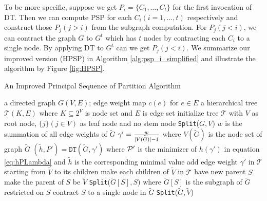 To be more specific, suppose we get $P_i = \{C_1, \dots, C_t\}$ for the first invocation of DT. Then we can compute PSP for each $C_i(i=1,\dots, t)$ respectively and construct those $P_j(j>i)$ from the subgraph computation. For $P_j(j<i)$, we can contract the graph $G$  to $G^t$ which has $t$ nodes by contracting each $C_i$ to a single node. By applying DT to $G^t$ can we get $P_j(j<i)$. We summarize our improved version (HPSP) in Algorithm \ref{alg:psp_i_simplified} and illustrate the algorithm by Figure \ref{fig:HPSP}.

\begin{algorithm}
	\caption{An Improved Principal Sequence of Partition Algorithm}\label{alg:psp_i_simplified}
	\begin{algorithmic}[1]
		\REQUIRE a directed graph $G(V, E)$; edge weight map $c(e)$ for $e\in E$
		\ENSURE a hierarchical tree $\mathcal{T}(K, E)$ where $K \subseteq 2^{V}$ is node set and $E$ is edge set
		\STATE initialize tree $\mathcal{T}$ with $V$ as root node, $\{j\}(j \in V)$ as leaf node and no stem node
		\STATE \texttt{Split}($G, V$)
		\STATE $w$ is the summation of all edge weights of $\widetilde{G}$ 
		\STATE $\gamma' = \frac{w}{\abs{V(\widetilde{G})}-1}$ where $V(\widetilde{G})$ is the node set of graph $\widetilde{G}$ \label{alg:gamma_apostrophe}
		\STATE $(\tilde{h}, P') = \texttt{DT}(\widetilde{G}, \gamma')$ where $\P'$ is the minimizer of $h(\gamma')$ in equation \eqref{eq:hPLambda} and $\tilde{h}$ is the corresponding minimal value  \label{line:DT}
		\STATE add edge weight $\gamma'$ in $\mathcal{T}$ starting from $\widetilde{V}$ to its children
		\ELSE
		\STATE make each children of $\widetilde{V}$ in $\mathcal{T}$ have new parent $S$		
		\STATE make the parent of $S$ be $\widetilde{V}$
		\STATE \texttt{Split}($\widetilde{G}[S], S$) where $\widetilde{G}[S]$ is the subgraph of $\widetilde{G}$ restricted on $S$ \label{line:SplitDown}
		\STATE contract $S$ to a single node in $\widetilde{G}$ %
		\ENDFOR 
		\STATE \texttt{Split}($\widetilde{G}, \widetilde{V}$)		\label{line:SplitUp}
		\ENDIF
		\ENDFUNCTION
	\end{algorithmic}
\end{algorithm}

